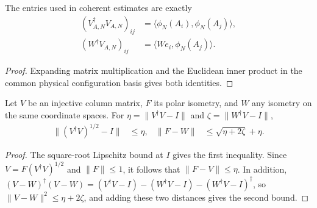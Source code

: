 \begin{lemma}
    \label{thm:ldp_sector_gram_cross_entries}
    \leanok
    The entries used in coherent estimates are exactly
    \begin{align}
        (V_{A,N}^\dagger V_{A,N})_{ij}
         & =\langle\phi_N(A_i),\phi_N(A_j)\rangle, \\
        (W^\dagger V_{A,N})_{ij}
         & =\langle We_i,\phi_N(A_j)\rangle.
        \label{eq:ldp_sector_complex_entries}
    \end{align}
\end{lemma}
\begin{proof}\leanok
    Expanding matrix multiplication and the Euclidean inner product in
    the common physical configuration basis gives both identities.
\end{proof}

\begin{lemma}
    \label{thm:ldp_polar_frame_bound}
    \leanok
    Let $V$ be an injective column matrix, $F$ its polar isometry, and
    $W$ any isometry on the same coordinate spaces. For
    $\eta=\|V^\dagger V-I\|$ and $\zeta=\|W^\dagger V-I\|$,
    \begin{align}
        \|(V^\dagger V)^{1/2}-I\| & \le\eta,                    &
        \|F-W\|                   & \le\sqrt{\eta+2\zeta}+\eta.
        \label{eq:ldp_polar_frame_bound}
    \end{align}
\end{lemma}
\begin{proof}\leanok
    The square-root Lipschitz bound at $I$ gives the first inequality.
    Since $V=F(V^\dagger V)^{1/2}$ and $\|F\|\le1$, it follows that
    $\|F-V\|\le\eta$. In addition,
    $(V-W)^\dagger(V-W)=(V^\dagger V-I)-(W^\dagger V-I)-(W^\dagger V-I)^\dagger$,
    so $\|V-W\|^2\le\eta+2\zeta$, and adding these two distances gives
    the second bound.
\end{proof}

